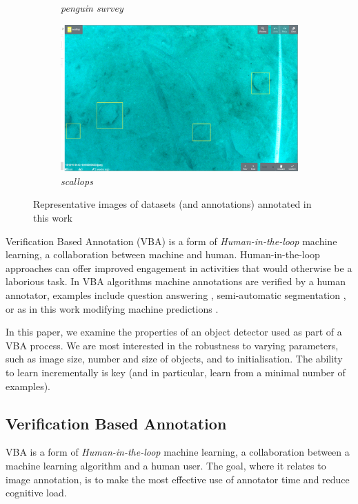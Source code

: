 \documentclass[conference]{IEEEtran}
\begin{document}
\begin{figure}[htb]
\begin{subfigure}[t]{0.2\linewidth}
  \caption{\emph{penguin survey}}
\end{subfigure}%
\begin{subfigure}[t]{0.2\linewidth}
  \includegraphics[width=0.9\linewidth]{figures/images/scallops4.png}
  \caption{\emph{scallops}}
\end{subfigure}
\caption{Representative images of datasets (and annotations) annotated in this work}
\label{fig:datasets_all}
\end{figure}

Verification Based Annotation (VBA) is a form of \emph{Human-in-the-loop} machine learning, a collaboration between machine and human.  Human-in-the-loop approaches can offer improved engagement in activities that would otherwise be a laborious task. In \gls{VBA} algorithms machine annotations are verified by a human annotator, examples include question answering \cite{Papadopoulos2016}, semi-automatic segmentation \cite{Castrejon2017}, or as in this work modifying machine predictions \cite{Yao2012, Russakovsky2015a, McNeill2011}. 

In this paper, we examine the properties of an object detector used as part of a \gls{VBA} process. We are most interested in the robustness to varying parameters, such as image size, number and size of objects, and to initialisation. The ability to learn incrementally is key (and in particular, learn from a minimal number of examples). 


\subsection{Verification Based Annotation}

\gls{VBA} is a form of \emph{Human-in-the-loop} machine learning, a collaboration between a machine learning algorithm and a human user. The goal, where it relates to image annotation, is to make the most effective use of annotator time and reduce cognitive load.
\end{document}
